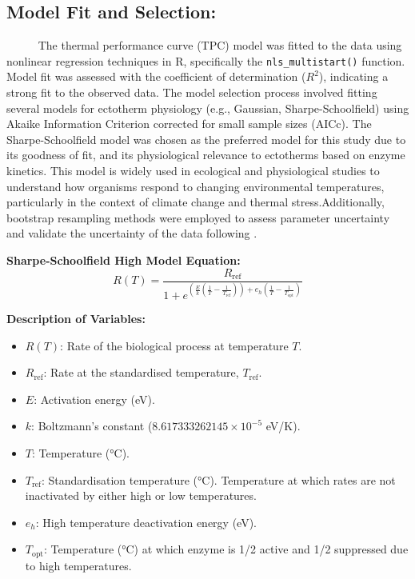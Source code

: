 \documentclass[
  12pt,
]{article}
\begin{document}
\subsection*{Model Fit and Selection:}

~~~~~ The thermal performance curve (TPC) model was fitted to the data
using nonlinear regression techniques in R, specifically the
\texttt{nls\_multistart()} function. Model fit was assessed with the
coefficient of determination (\(R^2\)), indicating a strong fit to the
observed data. The model selection process involved fitting several
models for ectotherm physiology (e.g., Gaussian, Sharpe-Schoolfield)
using Akaike Information Criterion corrected for small sample sizes
(AICc). The Sharpe-Schoolfield model was chosen as the preferred model
for this study due to its goodness of fit, and its physiological
relevance to ectotherms based on enzyme kinetics. This model is widely
used in ecological and physiological studies to understand how organisms
respond to changing environmental temperatures, particularly in the
context of climate change and thermal stress.Additionally, bootstrap
resampling methods were employed to assess parameter uncertainty and
validate the uncertainty of the data following
\cite{Olito2017estimating}.

\textbf{Sharpe-Schoolfield High Model Equation:} \begin{equation}
R(T) = \frac{R_{\text{ref}}}{1 + e^{\left(\frac{E}{k}\left(\frac{1}{T} - \frac{1}{T_{\text{ref}}}\right)\right) + e_h\left(\frac{1}{T} - \frac{1}{T_{\text{opt}}}\right)}}
\end{equation}

\textbf{Description of Variables:}

\begin{itemize}
    \item \( R(T) \): Rate of the biological process at temperature \( T \).
    \item \( R_{\text{ref}} \): Rate at the standardised temperature, \( T_{\text{ref}} \).
    \item \( E \): Activation energy (eV).
    \item \( k \): Boltzmann's constant (\( 8.617333262145 \times 10^{-5} \) eV/K).
    \item \( T \): Temperature (°C).
    \item \( T_{\text{ref}} \): Standardisation temperature (°C). Temperature at which rates are not inactivated by either high or low temperatures.
    \item \( e_h \): High temperature deactivation energy (eV).
    \item \( T_{\text{opt}} \): Temperature (°C) at which enzyme is 1/2 active and 1/2 suppressed due to high temperatures.
\end{itemize}
\end{document}
